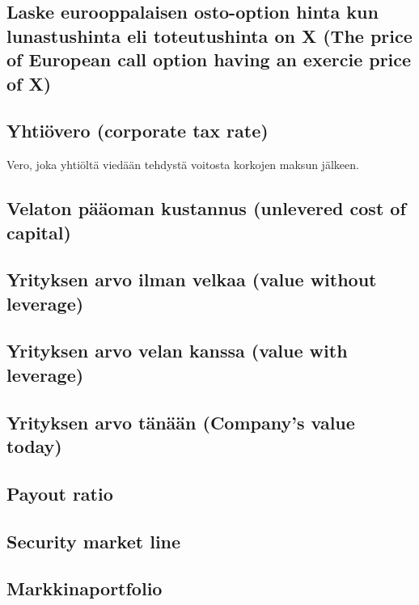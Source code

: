 \documentclass[a4paper]{article}
\begin{document}
\subsection{Laske eurooppalaisen osto-option hinta kun lunastushinta eli toteutushinta on X (The price of European call option having an exercie price of X)}

\subsection{Yhtiövero (corporate tax rate)}

Vero, joka yhtiöltä viedään tehdystä voitosta korkojen maksun jälkeen.

\subsection{Velaton pääoman kustannus (unlevered cost of capital)}

\subsection{Yrityksen arvo ilman velkaa (value without leverage)}

\subsection{Yrityksen arvo velan kanssa (value with leverage)}


\subsection{Yrityksen arvo tänään (Company's value today)}

\subsection{Payout ratio}

\subsection{Security market line}

\subsection{Markkinaportfolio}
\end{document}
